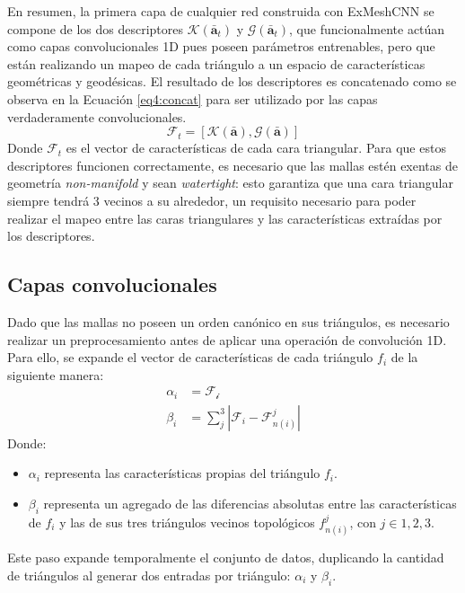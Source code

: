 En resumen, la primera capa de cualquier red construida con ExMeshCNN se compone de los dos descriptores $\mathcal{K}(\bar{\textbf{a}}_t)$ y $\mathcal{G}(\bar{\textbf{a}}_t)$, que funcionalmente actúan como capas convolucionales 1D pues poseen parámetros entrenables, pero que están realizando un mapeo de cada triángulo a un espacio de características geométricas y geodésicas. El resultado de los descriptores es concatenado como se observa en la Ecuación \ref{eq4:concat} para ser utilizado por las capas verdaderamente convolucionales.
\begin{equation}
    \label{eq4:concat}
    \mathcal{F}_{t} = \left[\mathcal{K}(\bar{\textbf{a}}), \mathcal{G}(\bar{\textbf{a}}) \right]
\end{equation}
Donde $\mathcal{F}_{t}$ es el vector de características de cada cara triangular. Para que estos descriptores funcionen correctamente, es necesario que las mallas estén exentas de geometría \textit{non-manifold} y sean \textit{watertight}: esto garantiza que una cara triangular siempre tendrá 3 vecinos a su alrededor, un requisito necesario para poder realizar el mapeo entre las caras triangulares y las características extraídas por los descriptores. 

\subsection{Capas convolucionales}
Dado que las mallas no poseen un orden canónico en sus triángulos, es necesario realizar un preprocesamiento antes de aplicar una operación de convolución 1D. Para ello, se expande el vector de características de cada triángulo $f_i$ de la siguiente manera:
\begin{align}
    \alpha_i &= \mathcal{F_i} \\
    \beta_i &= \sum_{j}^{3} | \mathcal{F}_{i} - \mathcal{F}_{n(i)}^{j}| 
\end{align}
Donde:
\begin{itemize}
    \item $\alpha_i$ representa las características propias del triángulo $f_i$.
    \item $\beta_i$ representa un agregado de las diferencias absolutas entre las características de $f_i$ y las de sus tres triángulos vecinos topológicos $f_{n(i)}^{j}$, con $j \in {1, 2, 3}$.
\end{itemize}

Este paso expande temporalmente el conjunto de datos, duplicando la cantidad de triángulos al generar dos entradas por triángulo: $\alpha_i$ y $\beta_i$.

